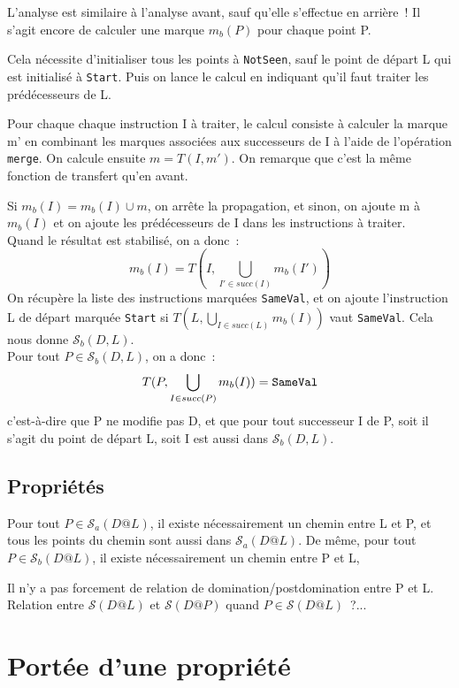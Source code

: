 \documentclass[a4paper,twoside]{article}
\renewcommand{\sc}{\mathcal{S}}
\newcommand{\sca}{\mathcal{S}_a}
\newcommand{\scb}{\mathcal{S}_b}
\begin{document}
L'analyse est similaire à l'analyse avant, sauf qu'elle s'effectue en arrière~!
Il s'agit encore de calculer une marque $m_b(P)$ pour chaque point P.

Cela nécessite d'initialiser tous les points à {\tt NotSeen},
sauf le point de départ L qui est initialisé à  {\tt Start}.
Puis on lance le calcul en indiquant qu'il faut traiter
les prédécesseurs de L.

Pour chaque chaque instruction I à traiter, le calcul consiste à
calculer la marque m' en combinant
les marques associées aux successeurs de I à l'aide de l'opération
{\tt merge}.
On calcule ensuite $m = T(I, m')$.
On remarque que c'est la même fonction de transfert qu'en avant.

Si $m_b(I) = m_b(I) \cup m$, on arrête la propagation,
et sinon, on ajoute m à $m_b(I)$
et on ajoute les prédécesseurs de I dans les  instructions à traiter.\\

Quand le résultat est stabilisé, on a donc~:
$$
m_b(I) = T(I, \bigcup_{I' \in succ(I)} m_b(I'))
$$
On récupère la liste des instructions
marquées {\tt SameVal},
et on ajoute l'instruction L de départ marquée {\tt Start}
si $T(L, \bigcup_{I \in succ(L)} m_b(I))$ vaut {\tt SameVal}.
Cela nous donne $\scb(D,L)$.\\

Pour tout $P \in \scb(D,L)$, on a donc~:
$$
T(P, \bigcup_{I \in succ(P)} m_b(I)) = {\tt SameVal}
$$
c'est-à-dire que P ne modifie pas D, et que pour tout successeur I de P,
soit il s'agit du point de départ L, soit I est aussi dans $\scb(D,L)$.

\subsection{Propriétés}



Pour tout $P \in \sca(D@L)$, il existe nécessairement un chemin entre L et P,
et tous les points du chemin sont aussi dans $ \sca(D@L)$.
De même, pour tout $P \in \scb(D@L)$,
il existe nécessairement un chemin entre P et L,

Il n'y a pas forcement de relation de domination/postdomination entre P et L.\\

Relation entre $\sc(D@L)$ et $\sc(D@P)$ quand $P \in \sc(D@L)$~?...

\section{Portée d'une propriété}\label{prop-scope}
\end{document}
